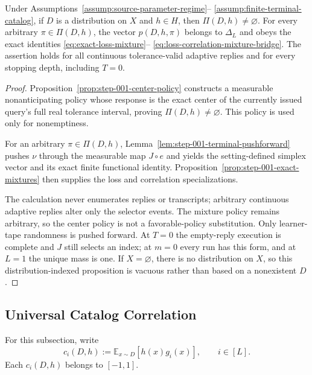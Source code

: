 \begin{proposition}
\label{prop:step-001-catalog-law}
Under Assumptions~\ref{assump:source-parameter-regime}--
\ref{assump:finite-terminal-catalog}, if $D$ is a distribution on $X$ and
$h\in H$, then $\Pi(D,h)\ne\varnothing$.  For every arbitrary
$\pi\in\Pi(D,h)$, the vector $p(D,h,\pi)$ belongs to $\Delta_L$ and obeys
the exact identities \eqref{eq:exact-loss-mixture}--
\eqref{eq:loss-correlation-mixture-bridge}.  The assertion holds for all
continuous tolerance-valid adaptive replies and for every stopping depth,
including $T=0$.
\end{proposition}

\begin{proof}
Proposition~\ref{prop:step-001-center-policy} constructs a measurable
nonanticipating policy whose response is the exact center of the currently
issued query's full real tolerance interval, proving
$\Pi(D,h)\ne\varnothing$.  This policy is used only for nonemptiness.

For an arbitrary $\pi\in\Pi(D,h)$,
Lemma~\ref{lem:step-001-terminal-pushforward} pushes $\nu$ through the
measurable map $J\circ e$ and yields the setting-defined simplex vector and
its exact finite functional identity.  Proposition~\ref{prop:step-001-exact-mixtures}
then supplies the loss and correlation specializations.

The calculation never enumerates replies or transcripts; arbitrary
continuous adaptive replies alter only the selector events.  The mixture
policy remains arbitrary, so the center policy is not a favorable-policy
substitution.  Only learner-tape randomness is pushed forward.  At $T=0$ the
empty-reply execution is complete and $J$ still selects an index; at $m=0$
every run has this form, and at $L=1$ the unique mass is one.  If
$X=\varnothing$, there is no distribution on $X$, so this
distribution-indexed proposition is vacuous rather than based on a
nonexistent $D$.
\end{proof}

\subsection{Universal Catalog Correlation}
\label{app:universal-catalog-correlation}

For this subsection, write
\[
c_i(D,h):=\mathbb E_{x\sim D}[h(x)g_i(x)],\qquad i\in[L].
\]
Each $c_i(D,h)$ belongs to $[-1,1]$.

